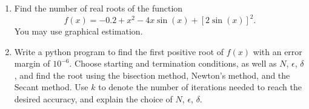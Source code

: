 \documentclass[11pt, a4paper]{article}
\begin{document}
\begin{exercise} \phantom{}
\begin{enumerate}
  \item[(1)] Find the number of real roots of the function
    \[
      f(x) = -0.2 + x^2 - 4x \sin(x) + \left[2 \sin(x)\right]^2.
    \]
    You may use graphical estimation.
  \item[(2)] Write a python program to find the first positive root of
    $f(x)$ with an error margin of $10^{-6}$.
    Choose starting and termination conditions, as well as $N$, $\epsilon$, 
    $\delta$, and find the root using the bisection method, Newton's method,
    and the Secant method.
    Use $k$ to denote the number of iterations needed to reach the desired
    accuracy, and explain the choice of $N$, $\epsilon$, $\delta$.
\end{enumerate}
\end{exercise}
\end{document}
